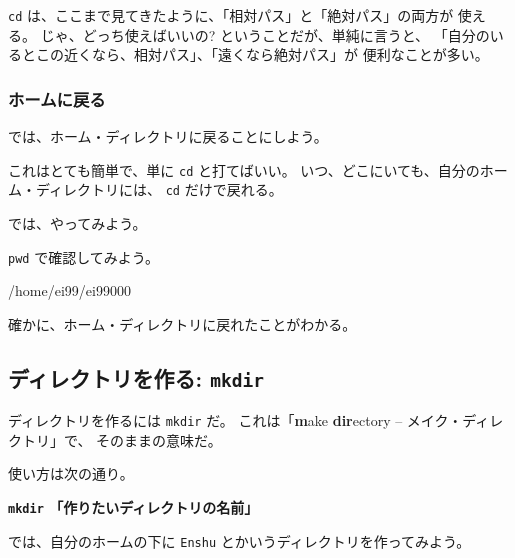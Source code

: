 \texttt{cd} は、ここまで見てきたように、「相対パス」と「絶対パス」の両方が
使える。
じゃ、どっち使えばいいの? ということだが、単純に言うと、
「自分のいるとこの近くなら、相対パス」、「遠くなら絶対パス」が
便利なことが多い。

\subsubsection{ホームに戻る}

では、ホーム・ディレクトリに戻ることにしよう。

これはとても簡単で、単に \texttt{cd} と打てばいい。
いつ、どこにいても、自分のホーム・ディレクトリには、 \texttt{cd} だけで戻れる。

では、やってみよう。

\begin{progls}
%
\end{progls}

 \texttt{pwd} で確認してみよう。

\begin{progls}
/home/ei99/ei99000
%
\end{progls}

確かに、ホーム・ディレクトリに戻れたことがわかる。

\newpage

\subsection{ディレクトリを作る: \texttt{mkdir}}

ディレクトリを作るには \texttt{mkdir} だ。
これは「\textbf{m}ake \textbf{dir}ectory -- メイク・ディレクトリ」で、
そのままの意味だ。

使い方は次の通り。

\begin{center}
\begin{minipage}{10cm}
\begin{shadebox}
\smallskip
{\Large\bf \texttt{mkdir} 「作りたいディレクトリの名前」}
\smallskip
\end{shadebox}
\end{minipage}
\end{center}


では、自分のホームの下に {\tt Enshu} とかいうディレクトリを作ってみよう。

\begin{progls}
%
\end{progls}

